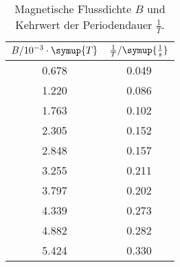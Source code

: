 \begin{table}[!htp]
\centering
\caption{Magnetische Flussdichte $B$ und Kehrwert der Periodendauer $\frac{1}{T}$.}
\label{tab:praezess2}
\begin{tabular}{c c}
\toprule
{$B / 10^{-3} \cdot \symup{T}$} & {$\frac{1}{T} / \symup{\frac{1}{s}}$} \\
\midrule
0.678 & 0.049 \\
1.220 & 0.086 \\
1.763 & 0.102 \\
2.305 & 0.152 \\
2.848 & 0.157 \\
3.255 & 0.211 \\
3.797 & 0.202 \\
4.339 & 0.273 \\
4.882 & 0.282 \\
5.424 & 0.330 \\
\bottomrule
\end{tabular}
\end{table}